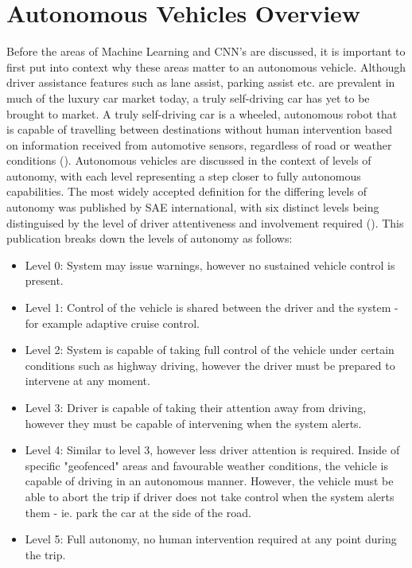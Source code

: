 \documentclass[12pt]{report}
\begin{document}
\section{Autonomous Vehicles Overview}
\begin{flushleft}
Before the areas of Machine Learning and CNN's are discussed, it is important to first put into context why these areas matter to an autonomous vehicle. Although driver assistance features such as lane assist, parking assist etc. are prevalent in much of the luxury car market today, a truly self-driving car has yet to be brought to market. A truly self-driving car is a wheeled, autonomous robot that is capable of travelling between destinations without human intervention based on information received from automotive sensors, regardless of road or weather conditions (\cite{zhao2018key}). Autonomous vehicles are discussed in the context of levels of autonomy, with each level representing a step closer to fully autonomous capabilities. The most widely accepted definition for the differing levels of autonomy was published by SAE international, with six distinct levels being distinguised by the level of driver attentiveness and involvement required (\cite{sae2016taxonomy}). This publication breaks down the levels of autonomy as follows:

\begin{itemize}
\item Level 0: System may issue warnings, however no sustained vehicle control is present.
\item Level 1: Control of the vehicle is shared between the driver and the system - for example adaptive cruise control.
\item Level 2: System is capable of taking full control of the vehicle under certain conditions such as highway driving, however the driver must be prepared to intervene at any moment.
\item Level 3: Driver is capable of taking their attention away from driving, however they must be capable of intervening when the system alerts.
\item Level 4: Similar to level 3, however less driver attention is required. Inside of specific "geofenced" areas and favourable weather conditions, the vehicle is capable of driving in an autonomous manner. However, the vehicle must be able to abort the trip if driver does not take control when the system alerts them - ie. park the car at the side of the road.
\item Level 5: Full autonomy, no human intervention required at any point during the trip.
\end{itemize}
\end{flushleft}
\end{document}
